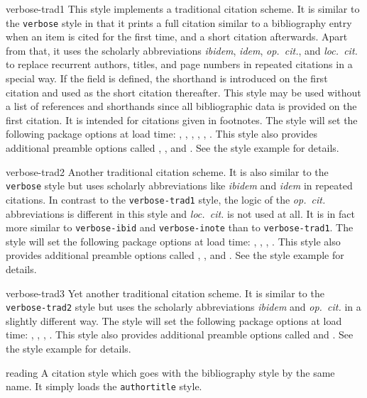 \begin{marglist}
\item[verbose-trad1]
This style implements a traditional citation scheme. It is similar to the \texttt{verbose} style in that it prints a full citation similar to a bibliography entry when an item is cited for the first time, and a short citation afterwards. Apart from that, it uses the scholarly abbreviations \emph{ibidem}, \emph{idem}, \emph{op.~cit.}, and \emph{loc.~cit.} to replace recurrent authors, titles, and page numbers in repeated citations in a special way. If the  field is defined, the shorthand is introduced on the first citation and used as the short citation thereafter. This style may be used without a list of references and shorthands since all bibliographic data is provided on the first citation. It is intended for citations given in footnotes. The style will set the following package options at load time: , , , , , . This style also provides additional preamble options called , , and . See the style example for details.

\item[verbose-trad2]
Another traditional citation scheme. It is also similar to the \texttt{verbose} style but uses scholarly abbreviations like \emph{ibidem} and \emph{idem} in repeated citations. In contrast to the \texttt{verbose-trad1} style, the logic of the \emph{op.~cit.} abbreviations is different in this style and \emph{loc.~cit.} is not used at all. It is in fact more similar to \texttt{verbose-ibid} and \texttt{verbose-inote} than to \texttt{verbose-trad1}. The style will set the following package options at load time: , , , . This style also provides additional preamble options called , , and . See the style example for details.

\item[verbose-trad3]
Yet another traditional citation scheme. It is similar to the \texttt{verbose-trad2} style but uses the scholarly abbreviations \emph{ibidem} and \emph{op.~cit.} in a slightly different way. The style will set the following package options at load time: , , , . This style also provides additional preamble options called  and . See the style example for details.

\item[reading]
A citation style which goes with the bibliography style by the same name. It simply loads the \texttt{authortitle} style.

\end{marglist}

